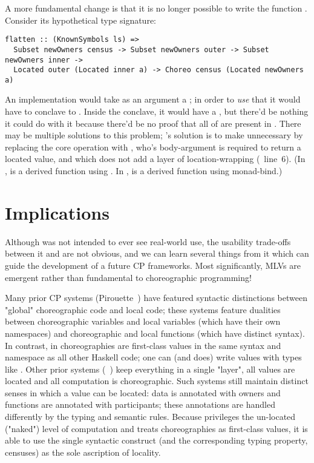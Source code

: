 A more fundamental change is that it is no longer possible to write the function .
Consider its hypothetical type signature:
\begin{verbatim}
flatten :: (KnownSymbols ls) =>
  Subset newOwners census -> Subset newOwners outer -> Subset newOwners inner ->
  Located outer (Located inner a) -> Choreo census (Located newOwners a)
\end{verbatim}
An implementation would take as an argument a ;
in order to \emph{use} that it would have to conclave to .
Inside the conclave, it would have a ,
but there'd be nothing it could do with it because there'd be no proof that all of  are present in .
There may be multiple solutions to this problem; \minichor's solution is to make  unnecessary
by replacing the core operation  with ,
who's body-argument is required to return a located value, and which does not add a layer of location-wrapping
(~line~6).
(In \MultiChor,  is a derived function using .
In \minichor,  is a derived function using monad-bind.)


\section{Implications}
\label{sec:minichor-implications}
Although \minichor was not intended to ever see real-world use,
the usability trade-offs between it and \MultiChor are not obvious,
and we can learn several things from it which can guide the development of a future CP frameworks.
Most significantly, MLVs are emergent rather than fundamental to choreographic programming!

Many prior CP systems (\eg Pirouette~\cite{hirsch2021pirouette}) have featured syntactic distinctions between "global" choreographic code
and local code;
these systems feature dualities between choreographic variables and local variables (which have their own namespaces)
and choreographic and local functions (which have distinct syntax).
In contrast, in \minichor choreographies are first-class values in the same syntax and namespace as all other Haskell code;
one can (and does) write values with types like .
Other prior systems (\eg \chorLambda~\cite{chor-lambda}) keep everything in a single "layer",
all values are located and all computation is choreographic.
Such systems still maintain distinct senses in which a value can be located:
data is annotated with owners and functions are annotated with participants;
these annotations are handled differently by the typing and semantic rules.
Because \minichor privileges the un-located ("naked") level of computation and treats choreographies as first-class values,
it is able to use the single syntactic construct  (and the corresponding typing property, censuses)
as the sole ascription of locality.

